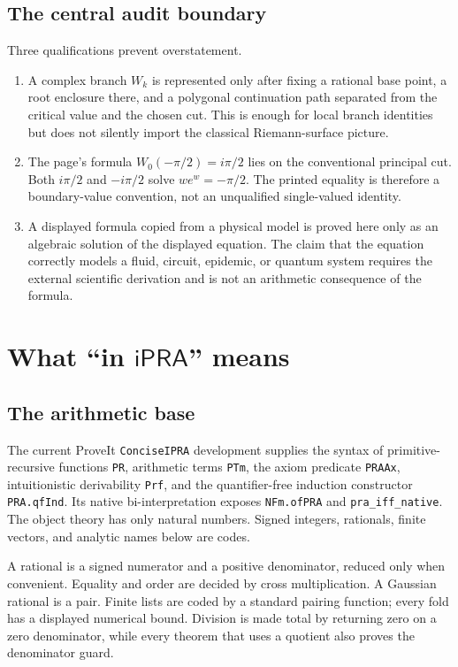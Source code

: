 \documentclass[11pt]{article}
\theoremstyle{definition}
\newcommand{\iPRA}{\mathsf{iPRA}}
\newcommand{\code}[1]{\nolinkurl{#1}}
\begin{document}
\subsection{The central audit boundary}

Three qualifications prevent overstatement.
\begin{enumerate}
\item A complex branch \(W_k\) is represented only after fixing a rational
base point, a root enclosure there, and a polygonal continuation path separated
from the critical value and the chosen cut.  This is enough for local branch
identities but does not silently import the classical Riemann-surface picture.
\item The page's formula \(W_0(-\pi/2)=i\pi/2\) lies on the conventional
principal cut.  Both \(i\pi/2\) and \(-i\pi/2\) solve \(we^w=-\pi/2\).  The
printed equality is therefore a boundary-value convention, not an
unqualified single-valued identity.
\item A displayed formula copied from a physical model is proved here only as
an algebraic solution of the displayed equation.  The claim that the equation
correctly models a fluid, circuit, epidemic, or quantum system requires the
external scientific derivation and is not an arithmetic consequence of the
formula.
\end{enumerate}

\section{What ``in \texorpdfstring{\(\iPRA\)}{iPRA}'' means}\label{sec:meaning}

\subsection{The arithmetic base}

The current ProveIt \code{ConciseIPRA} development supplies the syntax of
primitive-recursive functions \code{PR}, arithmetic terms \code{PTm}, the
axiom predicate \code{PRAAx}, intuitionistic derivability \code{Prf}, and the
quantifier-free induction constructor \code{PRA.qfInd}.  Its native
bi-interpretation exposes \code{NFm.ofPRA} and \code{pra_iff_native}.  The
object theory has only natural numbers.  Signed integers, rationals, finite
vectors, and analytic names below are codes.

A rational is a signed numerator and a positive denominator, reduced only when
convenient.  Equality and order are decided by cross multiplication.  A
Gaussian rational is a pair.  Finite lists are coded by a standard pairing
function; every fold has a displayed numerical bound.  Division is made total
by returning zero on a zero denominator, while every theorem that uses a
quotient also proves the denominator guard.
\end{document}
